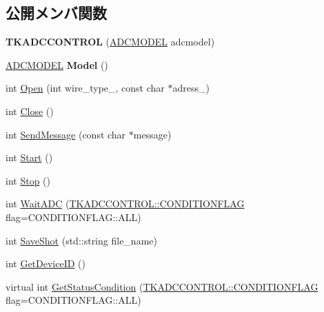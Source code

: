 \subsection*{公開メンバ関数}
\begin{DoxyCompactItemize}
\item 
\mbox{\label{class_t_k_a_d_c_c_o_n_t_r_o_l_a28a8b97f27c62f8bc60f8676f5906320}} 
{\bfseries T\+K\+A\+D\+C\+C\+O\+N\+T\+R\+OL} (\hyperlink{class_t_k_a_d_c_c_o_n_t_r_o_l_a9a5cfed6c86912f4b9053c8707cf89dd}{A\+D\+C\+M\+O\+D\+EL} adcmodel)
\item 
\mbox{\label{class_t_k_a_d_c_c_o_n_t_r_o_l_a1f6c755d05a5d9e3625b6777ccb39ccf}} 
\hyperlink{class_t_k_a_d_c_c_o_n_t_r_o_l_a9a5cfed6c86912f4b9053c8707cf89dd}{A\+D\+C\+M\+O\+D\+EL} {\bfseries Model} ()
\item 
int \hyperlink{class_t_k_a_d_c_c_o_n_t_r_o_l_a307cc5bd3358c89db6ec7798d47b2840}{Open} (int wire\+\_\+type\+\_\+, const char $\ast$adress\+\_\+)
\item 
int \hyperlink{class_t_k_a_d_c_c_o_n_t_r_o_l_a2f8903ef41b5b97ddf2d2f08a5374402}{Close} ()
\item 
int \hyperlink{class_t_k_a_d_c_c_o_n_t_r_o_l_a2808f2efde28bcfc670d0ddfe2c6791e}{Send\+Message} (const char $\ast$message)
\item 
int \hyperlink{class_t_k_a_d_c_c_o_n_t_r_o_l_afd243c443ca134193acc8a409368aaf3}{Start} ()
\item 
int \hyperlink{class_t_k_a_d_c_c_o_n_t_r_o_l_a3fc45766f6e7f770280f0e165827f86a}{Stop} ()
\item 
int \hyperlink{class_t_k_a_d_c_c_o_n_t_r_o_l_a7d6629217b6f034b9b546f88603d7f58}{Wait\+A\+DC} (\hyperlink{class_t_k_a_d_c_c_o_n_t_r_o_l_a4ec8bb3e68a489f7a757d08a855ffb61}{T\+K\+A\+D\+C\+C\+O\+N\+T\+R\+O\+L\+::\+C\+O\+N\+D\+I\+T\+I\+O\+N\+F\+L\+AG} flag=C\+O\+N\+D\+I\+T\+I\+O\+N\+F\+L\+A\+G\+::\+A\+LL)
\item 
int \hyperlink{class_t_k_a_d_c_c_o_n_t_r_o_l_a832915af5a7240efeef5c3fa139b99af}{Save\+Shot} (std\+::string file\+\_\+name)
\item 
int \hyperlink{class_t_k_a_d_c_c_o_n_t_r_o_l_a63b5da1398f6374705bb5b906e7d23b8}{Get\+Device\+ID} ()
\item 
virtual int \hyperlink{class_t_k_a_d_c_c_o_n_t_r_o_l_ad7009751520eecf10f2fd1aaed28b7df}{Get\+Status\+Condition} (\hyperlink{class_t_k_a_d_c_c_o_n_t_r_o_l_a4ec8bb3e68a489f7a757d08a855ffb61}{T\+K\+A\+D\+C\+C\+O\+N\+T\+R\+O\+L\+::\+C\+O\+N\+D\+I\+T\+I\+O\+N\+F\+L\+AG} flag=C\+O\+N\+D\+I\+T\+I\+O\+N\+F\+L\+A\+G\+::\+A\+LL)

\end{DoxyCompactItemize}
